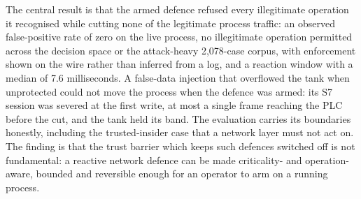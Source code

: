 The central result is that the armed defence refused every illegitimate operation it recognised while cutting none of the legitimate process traffic: an observed false-positive rate of zero on the live process, no illegitimate operation permitted across the decision space or the attack-heavy 2{,}078-case corpus, with enforcement shown on the wire rather than inferred from a log, and a reaction window with a median of 7.6 milliseconds. A false-data injection that overflowed the tank when unprotected could not move the process when the defence was armed: its S7 session was severed at the first write, at most a single frame reaching the PLC before the cut, and the tank held its band. The evaluation carries its boundaries honestly, including the trusted-insider case that a network layer must not act on. The finding is that the trust barrier which keeps such defences switched off is not fundamental: a reactive network defence can be made criticality- and operation-aware, bounded and reversible enough for an operator to arm on a running process.
